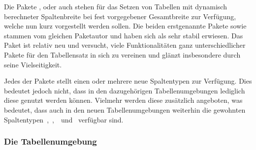 \documentclass[%
  english,ngerman,%
  cdgeometry=no,DIV=12,%
  cd=false,cdfont=false,cdtitle=true,%
  headings=normal,%
  automark,%
  listof=toc,%
]{tudscrartcl}
\begin{document}
Die Pakete ,  oder auch  
stehen für das Setzen von Tabellen mit dynamisch berechneter Spaltenbreite bei 
fest vorgegebener Gesamtbreite zur Verfügung, welche nun kurz vorgestellt 
werden sollen. Die beiden erstgenannte Pakete  sowie 
 stammen vom gleichen Paketautor und haben sich als sehr 
stabil erwiesen. Das Paket  ist relativ neu und versucht, viele 
Funktionalitäten ganz unterschiedlicher Pakete für den Tabellensatz in sich zu 
vereinen und glänzt insbesondere durch seine Vielseitigkeit. 
%
\begin{Preamble}
\usepackage{tabularx}
\usepackage{tabulary}
\usepackage{tabu}
\usepackage{longtable}

\end{Preamble}
%
Jedes der Pakete stellt einen oder mehrere neue Spaltentypen zur Verfügung. 
Dies bedeutet jedoch nicht, dass in den dazugehörigen Tabellenumgebungen 
lediglich diese genutzt werden können. Vielmehr werden diese zusätzlich 
angeboten, was bedeutet, dass auch in den neuen Tabellenumgebungen weiterhin 
die gewohnten Spaltentypen~,~,~~und~ 
verfügbar sind.



\subsubsection{%
  Die Tabellenumgebung %
  \label{sec:tabularx}%
}
\end{document}
